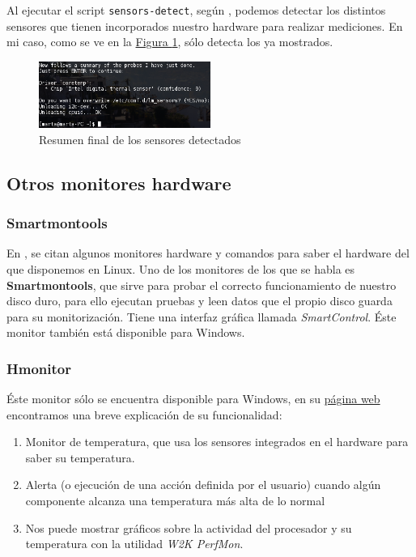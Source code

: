 \documentclass[10pt,a4paper,spanish]{article}
\numberwithin{equation}{section} %
\numberwithin{figure}{section} %
\numberwithin{table}{section} %
\begin{document}
Al ejecutar el script \texttt{sensors-detect}, según \cite{archsensors}, podemos detectar los distintos sensores que tienen incorporados nuestro hardware para realizar mediciones. En mi caso, como se ve en la \hyperref[sensorsdetect]{Figura \ref*{sensorsdetect}}, sólo detecta los ya mostrados.

\begin{figure}[!h]
    \centering
    \includegraphics[width=0.5\textwidth]{19}
    \caption{Resumen final de los sensores detectados}
    \label{sensorsdetect}
\end{figure}

\subsection{Otros monitores hardware}
\subsubsection{Smartmontools}
En \cite{linuxhw}, se citan algunos monitores hardware y comandos para saber el hardware del que disponemos en Linux. Uno de los monitores de los que se habla es \textbf{Smartmontools}, que sirve para probar el correcto funcionamiento de nuestro disco duro, para ello ejecutan pruebas y leen datos que el propio disco guarda para su monitorización. Tiene una interfaz gráfica llamada \textit{SmartControl}. Éste monitor también está disponible para Windows.

\subsubsection{Hmonitor}
Éste monitor sólo se encuentra disponible para Windows, en su \href{http://hmonitor.com/}{página web} encontramos una breve explicación de su funcionalidad:
\begin{enumerate}[$\bigstar$]
    \item Monitor de temperatura, que usa los sensores integrados en el hardware para saber su temperatura.
    \item Alerta (o ejecución de una acción definida por el usuario) cuando algún componente alcanza una temperatura más alta de lo normal
    \item Nos puede mostrar gráficos sobre la actividad del procesador y su temperatura con la utilidad \textit{W2K PerfMon}.
\end{enumerate}
\end{document}
